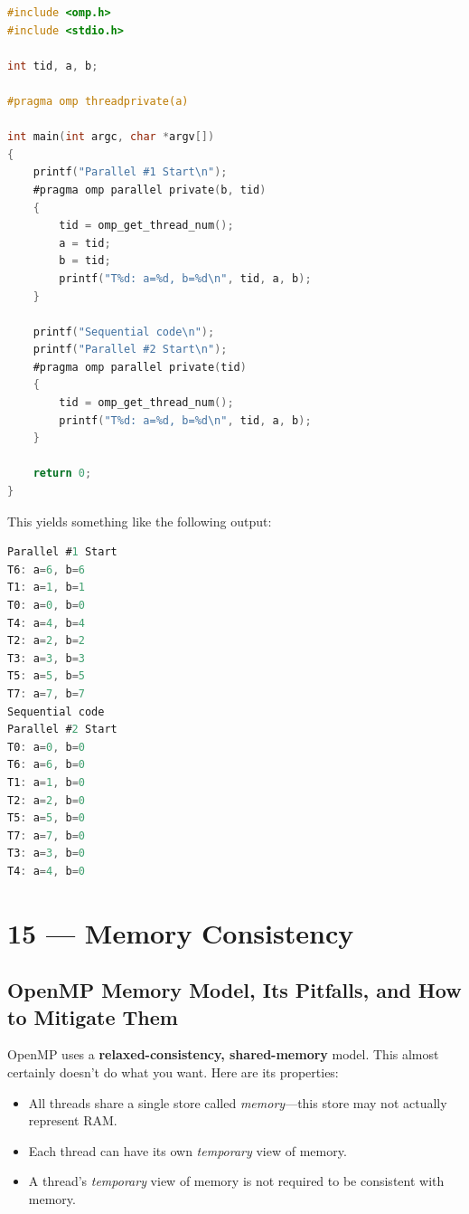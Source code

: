 \documentclass[a4paper]{report}
\begin{document}
\begin{lstlisting}[language=C,morekeywords={foreach,pragma,omp,parallel,single,nowait,task,untied,barrier,taskyield}]
#include <omp.h>
#include <stdio.h>

int tid, a, b;

#pragma omp threadprivate(a)

int main(int argc, char *argv[])
{
    printf("Parallel #1 Start\n");
    #pragma omp parallel private(b, tid)
    {
        tid = omp_get_thread_num();
        a = tid;
        b = tid;
        printf("T%d: a=%d, b=%d\n", tid, a, b);
    }

    printf("Sequential code\n");
    printf("Parallel #2 Start\n");
    #pragma omp parallel private(tid)
    {
        tid = omp_get_thread_num();
        printf("T%d: a=%d, b=%d\n", tid, a, b);
    }

    return 0;
}    
  \end{lstlisting}
This yields something like the following output:
\begin{lstlisting}[language=C,morekeywords={foreach,pragma,omp,parallel,single,nowait,task,untied,barrier,taskyield}]
% ./a.out
Parallel #1 Start
T6: a=6, b=6
T1: a=1, b=1
T0: a=0, b=0
T4: a=4, b=4
T2: a=2, b=2
T3: a=3, b=3
T5: a=5, b=5
T7: a=7, b=7
Sequential code
Parallel #2 Start
T0: a=0, b=0
T6: a=6, b=0
T1: a=1, b=0
T2: a=2, b=0
T5: a=5, b=0
T7: a=7, b=0
T3: a=3, b=0
T4: a=4, b=0
\end{lstlisting}










\chapter*{15 --- Memory Consistency}


\section*{OpenMP Memory Model, Its Pitfalls, and How to Mitigate Them}
OpenMP uses a {\bf relaxed-consistency, shared-memory} model. This almost certainly doesn't 
do what you want. Here are its properties:

\begin{itemize}
    \item All threads share a single store called
      \emph{memory}---this store may not actually represent RAM.
    \item Each thread can have its own {\it temporary} view of memory.
    \item A thread's {\it temporary} view of memory is not required to be
      consistent with memory.
\end{itemize}
\end{document}
